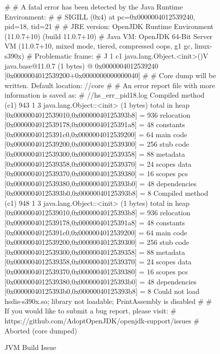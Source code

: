 \begin{figure}[H]
\centering
\begin{boxedverbatim}
#
# A fatal error has been detected by the Java Runtime Environment:
#
#  SIGILL (0x4) at pc=0x0000004012539240, pid=18, tid=21
#
# JRE version: OpenJDK Runtime Environment (11.0.7+10) (build 11.0.7+10)
# Java VM: OpenJDK 64-Bit Server VM (11.0.7+10, mixed mode, tiered, compressed oops, 
g1 gc, linux-s390x)
# Problematic frame:
# J 1 c1 java.lang.Object.<init>()V java.base@11.0.7 (1 bytes) @ 0x0000004012539240 
[0x0000004012539200+0x0000000000000040]
#
# Core dump will be written. Default location: //core
#
# An error report file with more information is saved as:
# //hs_err_pid18.log
Compiled method (c1)     943    1       3       java.lang.Object::<init> (1 bytes)
 total in heap  [0x0000004012539010,0x00000040125393b8] = 936
 relocation     [0x0000004012539178,0x00000040125391a8] = 48
 constants      [0x00000040125391c0,0x0000004012539200] = 64
 main code      [0x0000004012539200,0x0000004012539300] = 256
 stub code      [0x0000004012539300,0x0000004012539358] = 88
 metadata       [0x0000004012539358,0x0000004012539370] = 24
 scopes data    [0x0000004012539370,0x0000004012539380] = 16
 scopes pcs     [0x0000004012539380,0x00000040125393b0] = 48
 dependencies   [0x00000040125393b0,0x00000040125393b8] = 8
Compiled method (c1)     948    1       3       java.lang.Object::<init> (1 bytes)
 total in heap  [0x0000004012539010,0x00000040125393b8] = 936
 relocation     [0x0000004012539178,0x00000040125391a8] = 48
 constants      [0x00000040125391c0,0x0000004012539200] = 64
 main code      [0x0000004012539200,0x0000004012539300] = 256
 stub code      [0x0000004012539300,0x0000004012539358] = 88
 metadata       [0x0000004012539358,0x0000004012539370] = 24
 scopes data    [0x0000004012539370,0x0000004012539380] = 16
 scopes pcs     [0x0000004012539380,0x00000040125393b0] = 48
 dependencies   [0x00000040125393b0,0x00000040125393b8] = 8
Could not load hsdis-s390x.so; library not loadable; PrintAssembly is disabled
#
# If you would like to submit a bug report, please visit:
#   https://github.com/AdoptOpenJDK/openjdk-support/issues
#
Aborted (core dumped) 
\end{boxedverbatim}
 \caption{JVM Build Issue}
    \label{jvm-issue}
\end{figure}


